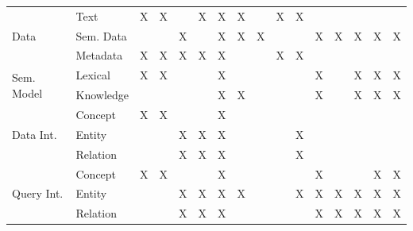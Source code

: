 \begin{table}[htbp]
\begin{tabular}{|r|r||c|c|r|c|c|c|c|c|c|c|c|c|c|r|}
    \multicolumn{1}{|l|}{\multirow{3}[6]{*}{Data}} & \multicolumn{1}{l||}{Text} & X     & X     &       & X     & X     & X     &       & X     & X     &       &       &       &       &  \bigstrut\\
\cline{2-16}    \multicolumn{1}{|l|}{} & \multicolumn{1}{l||}{Sem. Data} &       &       & X     &       & X     & X     & X     &       &       & X     & X     & X     & X     & \multicolumn{1}{c|}{X} \bigstrut\\
\cline{2-16}    \multicolumn{1}{|l|}{} & \multicolumn{1}{l||}{Metadata} & X     & X     & X     & X     & X     &       &       & X     & X     &       &       &       &       &  \bigstrut\\
    \hline
    \multicolumn{1}{|l|}{\multirow{2}[4]{*}{Sem. Model}} & \multicolumn{1}{l||}{Lexical} & X     & X     &       &       & X     &       &       &       &       & X     &       & X     & X     & \multicolumn{1}{c|}{X} \bigstrut\\
\cline{2-16}    \multicolumn{1}{|l|}{} & \multicolumn{1}{l||}{Knowledge} &       &       &       &       & X     & X     &       &       &       & X     &       & X     & X     & \multicolumn{1}{c|}{X} \bigstrut\\
    \hline
    \multicolumn{1}{|l|}{\multirow{3}[6]{*}{Data Int.}} & \multicolumn{1}{l||}{Concept} & X     & X     &       &       & X     &       &       &       &       &       &       &       &       &  \bigstrut\\
\cline{2-16}    \multicolumn{1}{|l|}{} & \multicolumn{1}{l||}{Entity} &       &       & X     & X     & X     &       &       &       & X     &       &       &       &       &  \bigstrut\\
\cline{2-16}    \multicolumn{1}{|l|}{} & \multicolumn{1}{l||}{Relation} &       &       & X     & X     & X     &       &       &       & X     &       &       &       &       &  \bigstrut\\
    \hline
    \multicolumn{1}{|l|}{\multirow{3}[6]{*}{Query Int.}} & \multicolumn{1}{l||}{Concept} & X     & X     &       &       & X     &       &       &       &       & X     &       &       & X     & \multicolumn{1}{c|}{X} \bigstrut\\
\cline{2-16}    \multicolumn{1}{|l|}{} & \multicolumn{1}{l||}{Entity} &       &       & X     & X     & X     & X     &       &       & X     & X     & X     & X     & X     & \multicolumn{1}{c|}{X} \bigstrut\\
\cline{2-16}    \multicolumn{1}{|l|}{} & \multicolumn{1}{l||}{Relation} &       &       & X     & X     & X     &       &       &       &       & X     & X     & X     & X     & \multicolumn{1}{c|}{X} \bigstrut\\

\end{tabular}
\end{table}
